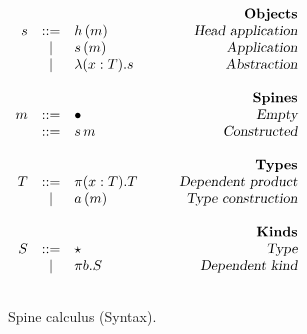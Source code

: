 \begin{figure}
\begin{center}
\begin{math}
\begin{array}{rclr}
&&&\qquad\textsl{\bf Objects}\\
s

&::=& 
h\,(m) 
& \qquad\textsl{Head application}
\\

&|& 
s\,(m) 
& \qquad\textsl{Application}
\\

&|&
\lambda (x : T). s
& \qquad\textsl{Abstraction}
\\
\\
&&&\qquad\textsl{\bf Spines}\\
m

&::=&
\bullet
& \qquad\textsl{Empty}
\\

&::=&
s\,m
& \qquad\textsl{Constructed}
\\
\\
&&&\qquad\textsl{\bf Types}\\
T

&::=&
\pi (x : T). T
& \qquad\textsl{Dependent product}
\\

&|&
a\,(m)
& \qquad\textsl{Type construction}
\\
\\
&&&\qquad\textsl{\bf Kinds}\\
S

&::=&
\star
& \qquad\textsl{Type}
\\

&|&
\pi b. S
& \qquad\textsl{Dependent kind}
\\
\\

\end{array}
\end{math}
\end{center}
\caption{Spine calculus (Syntax).}
\label{fig:syntax-s2}
\end{figure}
